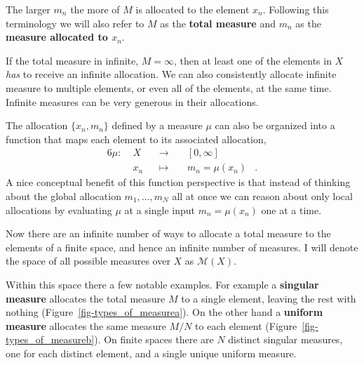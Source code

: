 \documentclass[
  letterpaper,
  DIV=11,
  numbers=noendperiod]{scrartcl}
\begin{document}
The larger \(m_{n}\) the more of \(M\) is allocated to the element
\(x_{n}\). Following this terminology we will also refer to \(M\) as the
\textbf{total measure} and \(m_{n}\) as the \textbf{measure allocated to
\(x_{n}\)}.

If the total measure in infinite, \(M = \infty\), then at least one of
the elements in \(X\) \emph{has} to receive an infinite allocation. We
can also consistently allocate infinite measure to multiple elements, or
even all of the elements, at the same time. Infinite measures can be
very generous in their allocations.

The allocation \(\{ x_{n}, m_{n} \}\) defined by a measure \(\mu\) can
also be organized into a function that maps each element to its
associated allocation, \begin{alignat*}{6}
\mu :\; & X & &\rightarrow& \; & [0, \infty] &
\\
& x_{n} & &\mapsto& & m_{n} = \mu(x_{n}) &.
\end{alignat*} A nice conceptual benefit of this function perspective is
that instead of thinking about the global allocation
\(m_1, \ldots, m_N\) all at once we can reason about only local
allocations by evaluating \(\mu\) at a single input
\(m_{n} = \mu(x_{n})\) one at a time.

Now there are an infinite number of ways to allocate a total measure to
the elements of a finite space, and hence an infinite number of
measures. I will denote the space of all possible measures over \(X\) as
\(\mathcal{M}(X)\).

Within this space there a few notable examples. For example a
\textbf{singular measure} allocates the total measure \(M\) to a single
element, leaving the rest with nothing
(Figure~\ref{fig-types_of_measurea}). On the other hand a
\textbf{uniform measure} allocates the same measure \(M / N\) to each
element (Figure~\ref{fig-types_of_measureb}). On finite spaces there are
\(N\) distinct singular measures, one for each distinct element, and a
single unique uniform measure.
\end{document}
